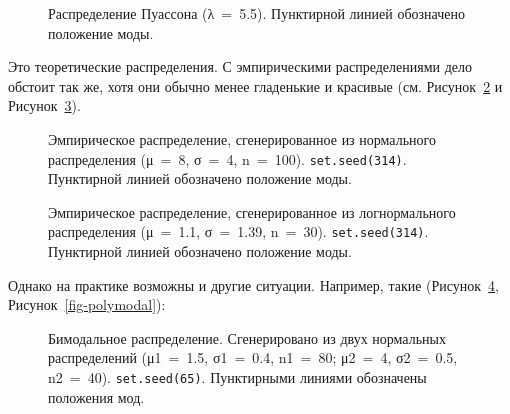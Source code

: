 \documentclass[
  letterpaper,
  DIV=11,
  numbers=noendperiod]{scrreprt}
\theoremstyle{definition}
\theoremstyle{remark}
\begin{document}
\begin{figure}


\caption{\label{fig-poiss-mode}Распределение Пуассона (λ~=~5.5).
Пунктирной линией обозначено положение моды.}

\end{figure}%

Это теоретические распределения. С эмпирическими распределениями дело
обстоит так же, хотя они обычно менее гладенькие и красивые (см.
Рисунок~\ref{fig-mode-norm-sample} и
Рисунок~\ref{fig-mode-nbinom-sample}).

\begin{figure}


\caption{\label{fig-mode-norm-sample}Эмпирическое распределение,
сгенерированное из нормального распределения (μ~=~8, σ~=~4, n~=~100).
\texttt{set.seed(314)}. Пунктирной линией обозначено положение моды.}

\end{figure}%

\begin{figure}


\caption{\label{fig-mode-nbinom-sample}Эмпирическое распределение,
сгенерированное из логнормального распределения (μ~=~1.1, σ~=~1.39,
n~=~30). \texttt{set.seed(314)}. Пунктирной линией обозначено положение
моды.}

\end{figure}%

Однако на практике возможны и другие ситуации. Например, такие
(Рисунок~\ref{fig-bimodal}, Рисунок~\ref{fig-polymodal}):

\begin{figure}


\caption{\label{fig-bimodal}Бимодальное распределение. Сгенерировано из
двух нормальных распределений (μ1~=~1.5, σ1~=~0.4, n1~=~80; μ2~=~4,
σ2~=~0.5, n2~=~40). \texttt{set.seed(65)}. Пунктирными линиями
обозначены положения мод.}

\end{figure}%
\end{document}
